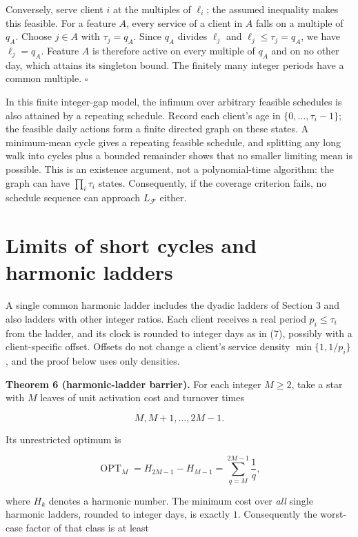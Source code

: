 \documentclass[
  british,
  11pt,
  a4paper,
]{article}
\begin{document}
Conversely, serve client \(i\) at the multiples of \(\ell_i\); the
assumed inequality makes this feasible. For a feature \(A\), every
service of a client in \(A\) falls on a multiple of \(q_A\). Choose
\(j\in A\) with \(\tau_j=q_A\). Since \(q_A\) divides \(\ell_j\) and
\(\ell_j\le\tau_j=q_A\), we have \(\ell_j=q_A\). Feature \(A\) is
therefore active on every multiple of \(q_A\) and on no other day, which
attains its singleton bound. The finitely many integer periods have a
common multiple. \(\square\)

In this finite integer-gap model, the infimum over arbitrary feasible
schedules is also attained by a repeating schedule. Record each client's
age in \(\{0,\ldots,\tau_i-1\}\); the feasible daily actions form a
finite directed graph on these states. A minimum-mean cycle gives a
repeating feasible schedule, and splitting any long walk into cycles
plus a bounded remainder shows that no smaller limiting mean is
possible. This is an existence argument, not a polynomial-time
algorithm: the graph can have \(\prod_i\tau_i\) states. Consequently, if
the coverage criterion fails, no schedule sequence can approach
\(L_{\mathcal F}\) either.

\section{Limits of short cycles and harmonic
ladders}\label{limits-of-short-cycles-and-harmonic-ladders}

A single common harmonic ladder includes the dyadic ladders of Section 3
and also ladders with other integer ratios. Each client receives a real
period \(p_i\le\tau_i\) from the ladder, and its clock is rounded to
integer days as in (7), possibly with a client-specific offset. Offsets
do not change a client's service density \(\min\{1,1/p_i\}\), and the
proof below uses only densities.

\textbf{Theorem 6 (harmonic-ladder barrier).} For each integer
\(M\ge2\), take a star with \(M\) leaves of unit activation cost and
turnover times

\[
M,M+1,\ldots,2M-1.
\]

Its unrestricted optimum is

\[
\operatorname{OPT}_M=H_{2M-1}-H_{M-1}
=\sum_{q=M}^{2M-1}\frac1q, \tag{26}
\]

where \(H_k\) denotes a harmonic number. The minimum cost over
\emph{all} single harmonic ladders, rounded to integer days, is exactly
\(1\). Consequently the worst-case factor of that class is at least
\end{document}
